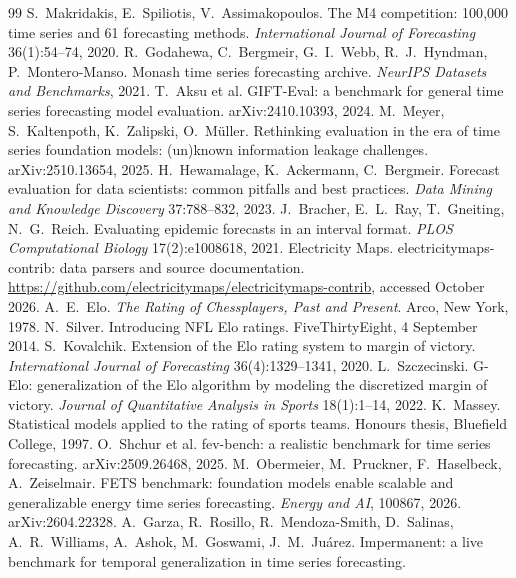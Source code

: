 \documentclass[11pt,a4paper]{article}
\begin{document}
\begin{thebibliography}{99}\small
{} S.~Makridakis, E.~Spiliotis, V.~Assimakopoulos. The M4 competition: 100{,}000 time series and 61
forecasting methods. \emph{International Journal of Forecasting} 36(1):54--74, 2020.
 R.~Godahewa, C.~Bergmeir, G.~I.~Webb, R.~J.~Hyndman, P.~Montero-Manso. Monash time series
forecasting archive. \emph{NeurIPS Datasets and Benchmarks}, 2021.
 T.~Aksu et al. GIFT-Eval: a benchmark for general time series forecasting model evaluation.
arXiv:2410.10393, 2024.
 M.~Meyer, S.~Kaltenpoth, K.~Zalipski, O.~M\"uller. Rethinking evaluation in the era of time
series foundation models: (un)known information leakage challenges. arXiv:2510.13654, 2025.
 H.~Hewamalage, K.~Ackermann, C.~Bergmeir. Forecast evaluation for data scientists: common
pitfalls and best practices. \emph{Data Mining and Knowledge Discovery} 37:788--832, 2023.
 J.~Bracher, E.~L.~Ray, T.~Gneiting, N.~G.~Reich. Evaluating epidemic forecasts in an interval format.
\emph{PLOS Computational Biology} 17(2):e1008618, 2021.
 Electricity Maps. electricitymaps-contrib: data parsers and source documentation.
\url{https://github.com/electricitymaps/electricitymaps-contrib}, accessed October 2026.
 A.~E.~Elo. \emph{The Rating of Chessplayers, Past and Present}. Arco, New York, 1978.
 N.~Silver. Introducing NFL Elo ratings. FiveThirtyEight, 4 September 2014.
 S.~Kovalchik. Extension of the Elo rating system to margin of victory. \emph{International Journal
of Forecasting} 36(4):1329--1341, 2020.
 L.~Szczecinski. G-Elo: generalization of the Elo algorithm by modeling the discretized margin of
victory. \emph{Journal of Quantitative Analysis in Sports} 18(1):1--14, 2022.
 K.~Massey. Statistical models applied to the rating of sports teams. Honours thesis, Bluefield
College, 1997.
 O.~Shchur et al. fev-bench: a realistic benchmark for time series forecasting. arXiv:2509.26468, 2025.
 M.~Obermeier, M.~Pruckner, F.~Haselbeck, A.~Zeiselmair. FETS benchmark: foundation models enable scalable
and generalizable energy time series forecasting. \emph{Energy and AI}, 100867, 2026. arXiv:2604.22328.
 A.~Garza, R.~Rosillo, R.~Mendoza-Smith, D.~Salinas, A.~R.~Williams, A.~Ashok, M.~Goswami,
J.~M.~Ju\'arez. Impermanent: a live benchmark for temporal generalization in time series forecasting.

\end{thebibliography}
\end{document}
